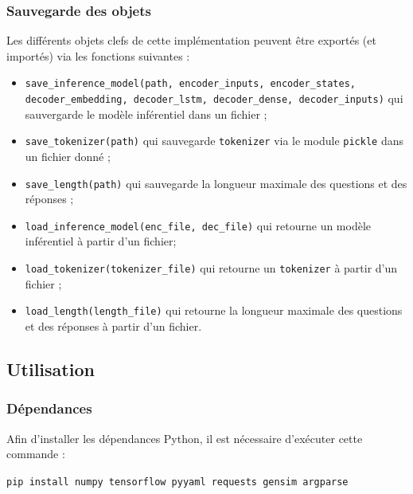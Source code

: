 \documentclass[10pt,a4paper]{article}
\begin{document}
\subsubsection{Sauvegarde des objets}
Les différents objets clefs de cette implémentation peuvent être exportés (et importés) via les fonctions suivantes :
\begin{itemize}
\item \texttt{save\_inference\_model(path, encoder\_inputs, encoder\_states, decoder\_embedding, decoder\_lstm, decoder\_dense, decoder\_inputs)} qui sauvergarde le modèle inférentiel dans un fichier ;
\item \texttt{save\_tokenizer(path)} qui sauvegarde \texttt{tokenizer} via le module \texttt{pickle} dans un fichier donné ;
\item \texttt{save\_length(path)} qui sauvegarde la longueur maximale des questions et des réponses ;
\item \texttt{load\_inference\_model(enc\_file, dec\_file)} qui retourne un modèle inférentiel à partir d'un fichier;
\item \texttt{load\_tokenizer(tokenizer\_file)} qui retourne un \texttt{tokenizer} à partir d'un fichier ;
\item \texttt{load\_length(length\_file)} qui retourne la longueur maximale des questions et des réponses à partir d'un fichier. 
\end{itemize}

\subsection{Utilisation}
\subsubsection{Dépendances}

Afin d'installer les dépendances Python, il est nécessaire d’exécuter cette commande :
\begin{center}
\texttt{pip install numpy tensorflow pyyaml requests gensim argparse}
\end{center}
\end{document}

